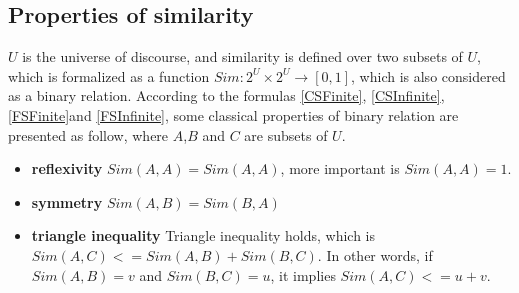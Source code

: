 \subsection{Properties of similarity}
\label{sec:Property}
$U$ is the universe of discourse, and similarity is defined over two subsets of $U$, which is formalized as a function $Sim: 2^{U} \times 2^{U} \rightarrow [0,1]$, which is also considered as a binary relation. According to the formulas \eqref{CSFinite}, \eqref{CSInfinite}, \eqref{FSFinite}and \eqref{FSInfinite}, some classical properties of binary relation are presented as follow, where $A$,$B$ and $C$ are subsets of $U$.
\begin{itemize}
\item \textbf{reflexivity}
$Sim(A,A)=Sim(A,A)$, more important is $Sim(A,A)=1$.
\item \textbf{symmetry}
$Sim(A,B)=Sim(B,A)$
\item \textbf{triangle inequality}
Triangle inequality holds, which is $Sim(A,C)<=Sim(A,B)+Sim(B,C)$. In other words, if $Sim(A,B)=v$ and $Sim(B,C)=u$, it implies $Sim(A,C)<=u+v$. 
\end{itemize}
